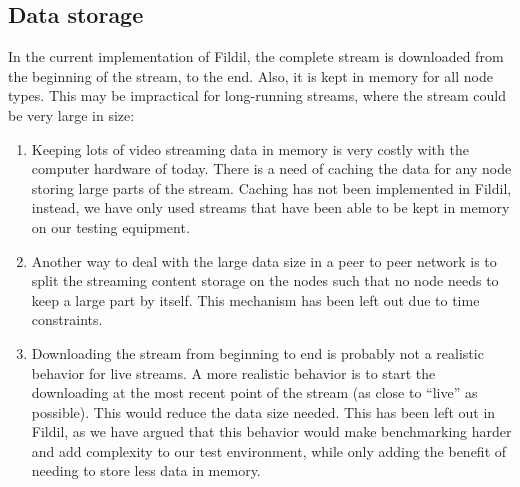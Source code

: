 \documentclass[10pt, a4paper]{article}
\begin{document}
\subsection{Data storage}
\label{sec:storage-improvements}

In the current implementation of Fildil, the complete stream is downloaded from
the beginning of the stream, to the end. Also, it is kept in memory for all node
types. This may be impractical for long-running streams, where the stream could
be very large in size:

\begin{enumerate}
\item Keeping lots of video streaming data in memory is very costly with the
  computer hardware of today. There is a need of caching the data for any node
  storing large parts of the stream. Caching has not been implemented in Fildil,
  instead, we have only used streams that have been able to be kept in memory on
  our testing equipment.
\item Another way to deal with the large data size in a peer to peer network is
  to split the streaming content storage on the nodes such that no node needs to
  keep a large part by itself. This mechanism has been left out due to time
  constraints. %
\item Downloading the stream from beginning to end is probably not a realistic
  behavior for live streams. A more realistic behavior is to start the
  downloading at the most recent point of the stream (as close to ``live'' as
  possible). This would reduce the data size needed. This has been left out in
  Fildil, as we have argued that this behavior would make benchmarking harder
  and add complexity to our test environment, while only adding the benefit of
  needing to store less data in memory.
\end{enumerate}

\newpage


\end{document}
